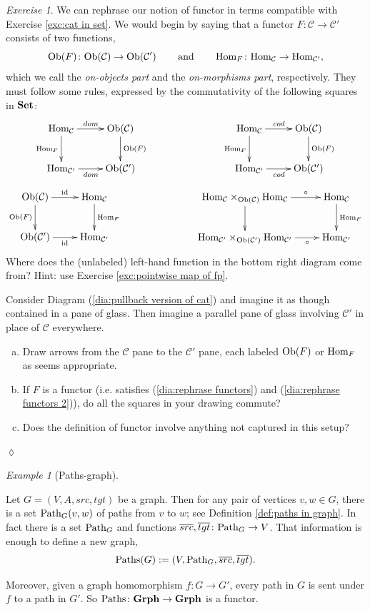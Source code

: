 \documentclass{book}
\def\tn{\textnormal}
\def\mc{\mathcal}
\def\Hom{\tn{Hom}}
\def\Path{\tn{Path}}
\def\Paths{\tn{Paths}}
\def\Ob{\tn{Ob}}
\def\hsp{\hspace{.3in}}
\def\to{\rightarrow}
\def\taking{\colon}
\def\ol{\overline}
\def\id{\tn{id}}
\def\Grph{{\bf Grph}}
\def\Set{{\bf Set}}
\def\mcC{\mc{C}}
\theoremstyle{remark}
\newtheorem{example}[subsubsection]{Example}
\newtheorem{exc}[subsubsection]{Exercise}
\newenvironment{exercise}{\begin{exc}}{\hspace*{\fill}$\lozenge$\end{exc}}
\theoremstyle{definition}
\def\sexc{\begin{enumerate}[a.)]\setlength{\itemsep}{.1cm}\setlength{\parskip}{.1cm}\item}
\def\next{\item}
\def\endsexc{\end{enumerate}}
\begin{document}
\begin{exercise}\label{exc:rephrase functors}
We can rephrase our notion of functor in terms compatible with Exercise \ref{exc:cat in set}. We would begin by saying that a functor $F\taking\mcC\to\mcC'$ consists of two functions, $$\Ob(F)\taking\Ob(\mcC)\to\Ob(\mcC')\hsp\tn{and}\hsp\Hom_F\taking\Hom_\mcC\to\Hom_{\mcC'},$$ which we call the {\em on-objects part} and the {\em on-morphisms part}, respectively. They must follow some rules, expressed by the commutativity of the following squares in $\Set$:
\begin{align}\label{dia:rephrase functors}
\xymatrix{
\Hom_\mcC\ar[r]^{dom}\ar[d]_{\Hom_F}&\Ob(\mcC)\ar[d]^{\Ob(F)}\\
\Hom_{\mcC'}\ar[r]_{dom}&\Ob(\mcC')
}
\hspace{1in}
\xymatrix{
\Hom_\mcC\ar[r]^{cod}\ar[d]_{\Hom_F}&\Ob(\mcC)\ar[d]^{\Ob(F)}\\
\Hom_{\mcC'}\ar[r]_{cod}&\Ob(\mcC')}
\end{align}
\begin{align}\label{dia:rephrase functors 2}
\xymatrix{
\Ob(\mcC)\ar[d]_{\Ob(F)}\ar[r]^{\id}&\Hom_\mcC\ar[d]^{\Hom_F}\\
\Ob(\mcC')\ar[r]_{\id}&\Hom_{\mcC'}
}
\hspace{1in}
\xymatrix{
\Hom_\mcC\times_{\Ob(\mcC)}\Hom_{\mcC}\ar[r]^-{\circ}\ar[d]_{}&\Hom_\mcC\ar[d]^{\Hom_F}\\
\Hom_{\mcC'}\times_{\Ob(\mcC')}\Hom_{\mcC'}\ar[r]_-{\circ}&\Hom_{\mcC'}}
\end{align}
Where does the (unlabeled) left-hand function in the bottom right diagram come from? Hint: use Exercise \ref{exc:pointwise map of fp}.

Consider Diagram (\ref{dia:pullback version of cat}) and imagine it as though contained in a pane of glass. Then imagine a parallel pane of glass involving $\mcC'$ in place of $\mcC$ everywhere. 
\sexc Draw arrows from the $\mcC$ pane to the $\mcC'$ pane, each labeled $\Ob(F)$ or $\Hom_F$ as seems appropriate.
\next If $F$ is a functor (i.e. satisfies (\ref{dia:rephrase functors}) and (\ref{dia:rephrase functors 2})), do all the squares in your drawing commute?
\next  Does the definition of functor involve anything not captured in this setup?
\endsexc
\end{exercise}

\begin{example}[Paths-graph]\label{ex:paths-graph}

Let $G=(V,A,src,tgt)$ be a graph. Then for any pair of vertices $v,w\in G$, there is a set $\Path_G(v,w)$ of paths from $v$ to $w$; see Definition \ref{def:paths in graph}. In fact there is a set $\Path_G$ and functions $\ol{src},\ol{tgt}\taking\Path_G\to V$. That information is enough to define a new graph, $$\Paths(G):=(V,\Path_G,\ol{src},\ol{tgt}).$$

Moreover, given a graph homomorphism $f\taking G\to G'$, every path in $G$ is sent under $f$ to a path in $G'$. So $\Paths\taking\Grph\to\Grph$\index{a functor!$\Paths\taking\Grph\to\Grph$} is a functor.

\end{example}
\end{document}
